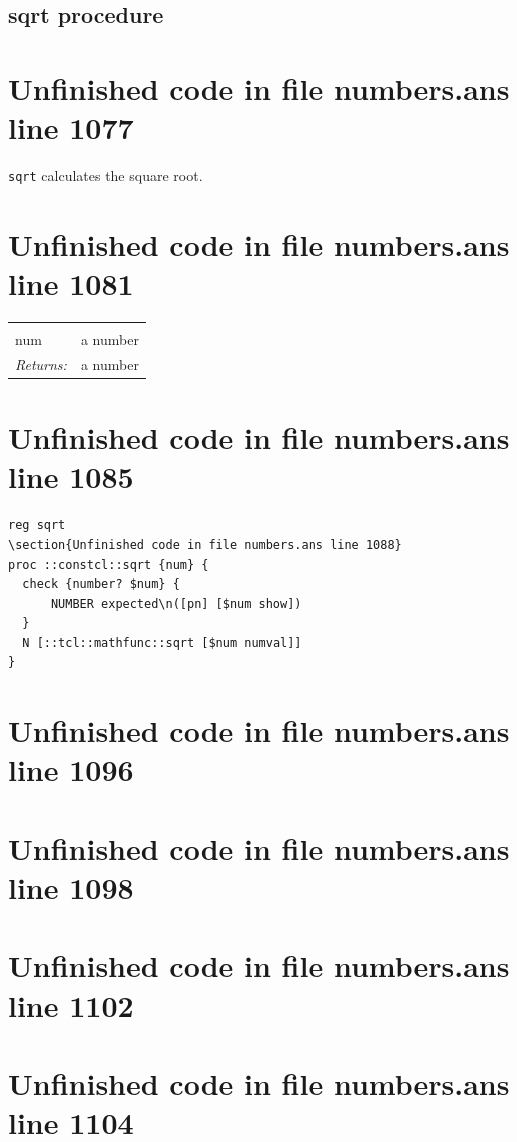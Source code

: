 \documentclass[twoside,9pt]{report}
\begin{document}
\subsection{sqrt procedure}
\label{sqrt-procedure}
\section{Unfinished code in file numbers.ans line 1077}


\texttt{sqrt} calculates the square root.

\section{Unfinished code in file numbers.ans line 1081}
\noindent\begin{tabular}{ |p{1.9cm} p{8cm}| }
\hline
\rowcolor[HTML]{CCCCCC} \multicolumn{2}{|l|}{\bf sqrt (public)} \\
num & a number \\
\textit{Returns:} & a number \\
\hline
\end{tabular}
\section{Unfinished code in file numbers.ans line 1085}
\begin{lstlisting}
reg sqrt
\section{Unfinished code in file numbers.ans line 1088}
proc ::constcl::sqrt {num} {
  check {number? $num} {
      NUMBER expected\n([pn] [$num show])
  }
  N [::tcl::mathfunc::sqrt [$num numval]]
}
\end{lstlisting}
\section{Unfinished code in file numbers.ans line 1096}
\section{Unfinished code in file numbers.ans line 1098}
\section{Unfinished code in file numbers.ans line 1102}
\section{Unfinished code in file numbers.ans line 1104}
\end{document}
